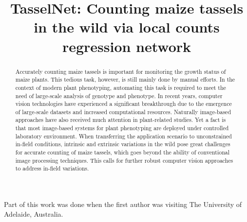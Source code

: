 \documentclass[twocolumn]{bmcart}%
\begin{document}
\begin{frontmatter}

\begin{fmbox}


\title{TasselNet: Counting maize tassels in the wild via local counts regression network
}



\author[
   addressref={aff1},                   %
   email={poppinace@hust.edu.cn}        %
]{ }
\author[
   addressref={aff1},
   corref={aff1},                       %
   email={zgcao@hust.edu.cn}
]{ }
\author[
addressref={aff1},
email={Yang\_Xiao@hust.edu.cn}
]{ }
\author[
addressref={aff2},
email={bohan.zhuang@adelaide.edu.au}
]{ }
\author[
addressref={aff2},
email={chunhua.shen@adelaide.edu.au}
]{ }





\address[id=aff1]{%
  , %
  ,                               %
  ,                          %
}
\address[id=aff2]{%
  ,
  ,
  ,
}


\begin{artnotes}{Part of this work was done when
the first author was visiting The University of Adelaide, Australia.}
\end{artnotes}






\begin{abstractbox}

\begin{abstract} %

Accurately counting maize tassels is important for monitoring the growth status of maize plants. This tedious task, however, is still mainly done by manual efforts. In the context of modern plant phenotyping, automating this task is required to meet the need of large-scale analysis of genotype and phenotype. In recent years, computer vision technologies have experienced a significant breakthrough due to the emergence of large-scale datasets and increased computational resources. Naturally image-based approaches have also received much attention in plant-related studies. Yet a fact is that most image-based systems for plant phenotyping are deployed under controlled laboratory environment. When transferring the application scenario to unconstrained in-field conditions, intrinsic and extrinsic variations in the wild pose great challenges for accurate counting of maize tassels, which goes beyond the ability of conventional image processing techniques. This calls for further robust computer vision approaches to address in-field variations.


\end{abstract}
\end{abstractbox}
\end{fmbox}
\end{frontmatter}
\end{document}
